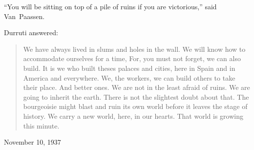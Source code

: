 ``You will be sitting on top of a pile of ruins if you are victorious,'' said Van~Paassen.

\medskip

Durruti answered:

\begin{quotation}
  We have always lived in slums and holes in the wall. We will know how to accommodate ourselves for a time, For, you must not forget, we can also build. It is we who built theses palaces and cities, here in Spain and in America and everywhere. We, the workers, we can build others to take their place. And better ones. We are not in the least afraid of ruins. We are going to inherit the earth. There is not the slightest doubt about that. The bourgeoisie might blast and ruin its own world before it leaves the stage of history. We carry a new world, here, in our hearts. That world is growing this minute.%
\end{quotation}

\begin{flushright}
  November 10, 1937
\end{flushright}